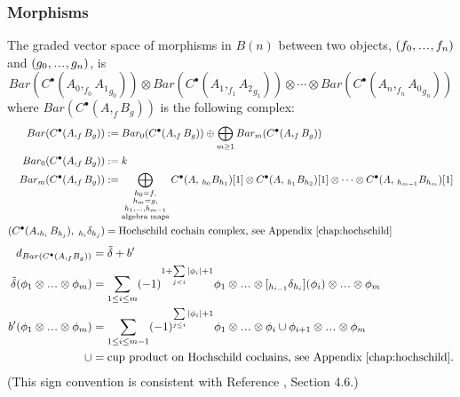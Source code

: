 \subsubsection{Morphisms}
The graded vector space of morphisms in 
$B(n)$ between two objects, 
$(f_0, \smdots, f_n)$ and 
$(g_0, \smdots, g_n)$, is 
%
\begin{equation*}
Bar(C^\bullet(A_0, _{f_0}{A_1}_{g_0})) \otimes Bar(C^\bullet(A_1, _{f_1}{A_2}_{g_1})) \otimes \cdots
\otimes Bar(C^\bullet(A_n, _{f_n}{A_0}_{g_n}))
\end{equation*}
%
where $Bar(C^\bullet(A, _fB_g))$ is 
the following complex: 
%
\begin{align*}
Bar(C^\bullet(A, _fB_g)) 
&:= Bar_0(C^\bullet(A, _fB_g)) \oplus 
  \bigoplus_{\substack{m \geq 1}} 
    Bar_m(C^\bullet(A, _fB_g)) \\
Bar_0(C^\bullet(A, _fB_g))    
&:= k\\ 
Bar_m(C^\bullet(A, _fB_g))
&:= 
  \bigoplus \limits_{\substack{
  h_0 = f, \\
  h_m = g, \\
  h_1, \dots, h_{m-1}\\ 
	\textrm{algebra maps}}} 
  C^\bullet(A, \, _{h_0}B_{h_1})[1] \otimes 
  C^\bullet(A, \, _{h_1}B_{h_2})[1] 
  \otimes \dots \otimes 
  C^\bullet(A, \, _{h_{m-1}}B_{h_m})[1]\\
(C^\bullet(A, _{h_i}B_{h_j}), \;
  _{h_i}\delta_{h_j})
&=
\textrm{Hochschild cochain complex, 
see Appendix \ref{chap:hochschild}}
\end{align*}
\begin{align*}
d_{Bar(C^\bullet(A, _fB_g))} 
&= 
\tilde{\delta} + b^\prime\\
\tilde{\delta}(\phi_1 \otimes \smdots \otimes \phi_m)
&=
\sum \limits_{1 \leq i \leq m}
  (-1)^{1+ \sum \limits_{j<i} |\phi_i|+1}
  \phi_1 \otimes \smdots \otimes 
  [_{h_{i-1}}\delta_{h_i}](\phi_i)
  \otimes \smdots \otimes \phi_m\\
b^\prime(\phi_1 \otimes \smdots \otimes \phi_m)
&=
\sum \limits_{1 \leq i \leq m-1}
  (-1)^{\sum \limits_{j\leq i} |\phi_i|+1}
  \phi_1 \otimes \smdots \otimes 
  \phi_i \cup \phi_{i+1}
  \otimes \smdots \otimes \phi_m\\  
\cup
&= 
\textrm{cup product on Hochschild cochains, 
see Appendix \ref{chap:hochschild}.}  
\end{align*}
(This sign convention is consistent with 
Reference \cite{T}, Section 4.6.)
%
